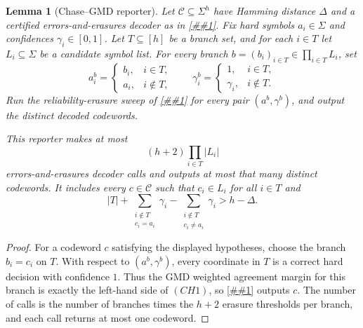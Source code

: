 \documentclass[10pt]{article}
\newcommand{\cref}[1]{\ref{##1}}
\newtheorem{lemma}[theorem]{Lemma}
\theoremstyle{definition}
\begin{document}
\begin{lemma}[Chase--GMD reporter]
   \label{lem:chase-gmd-reporter}
   Let \(\mathcal C\subseteq\Sigma^h\) have Hamming distance \(\Delta\) and a
   certified errors-and-erasures decoder as in
   \cref{lem:reliability-erasure-sweep}.  Fix hard symbols \(a_i\in\Sigma\)
   and confidences \(\gamma_i\in[0,1]\).  Let \(T\subseteq[h]\) be a branch
   set, and for each \(i\in T\) let \(L_i\subseteq\Sigma\) be a candidate
   symbol list.  For every branch
   \(b=(b_i)_{i\in T}\in\prod_{i\in T}L_i\), set
   \[
      a^b_i=
      \begin{cases}
         b_i, & i\in T,\\
         a_i, & i\notin T,
      \end{cases}
      \qquad
      \gamma^b_i=
      \begin{cases}
         1, & i\in T,\\
         \gamma_i, & i\notin T.
      \end{cases}
   \]
   Run the reliability-erasure sweep of
   \cref{lem:reliability-erasure-sweep} for every pair
   \((a^b,\gamma^b)\), and output the distinct decoded codewords.

   This reporter makes at most
   \[
      (h+2)\prod_{i\in T}|L_i|
   \]
   errors-and-erasures decoder calls and outputs at most that many distinct
   codewords.  It includes every \(c\in\mathcal C\) such that
   \(c_i\in L_i\) for all \(i\in T\) and
   \[
      |T|
      +
      \sum_{\substack{i\notin T\\ c_i=a_i}}\gamma_i
      -
      \sum_{\substack{i\notin T\\ c_i\ne a_i}}\gamma_i
      >
      h-\Delta .
      \tag{CH1}
   \]
\end{lemma}

\begin{proof}
   For a codeword \(c\) satisfying the displayed hypotheses, choose the branch
   \(b_i=c_i\) on \(T\).  With respect to \((a^b,\gamma^b)\), every coordinate
   in \(T\) is a correct hard decision with confidence \(1\).  Thus the GMD
   weighted agreement margin for this branch is exactly the left-hand side of
   \((CH1)\), so \cref{lem:reliability-erasure-sweep} outputs \(c\).  The
   number of calls is the number of branches times the \(h+2\) erasure
   thresholds per branch, and each call returns at most one codeword.
\end{proof}
\end{document}
